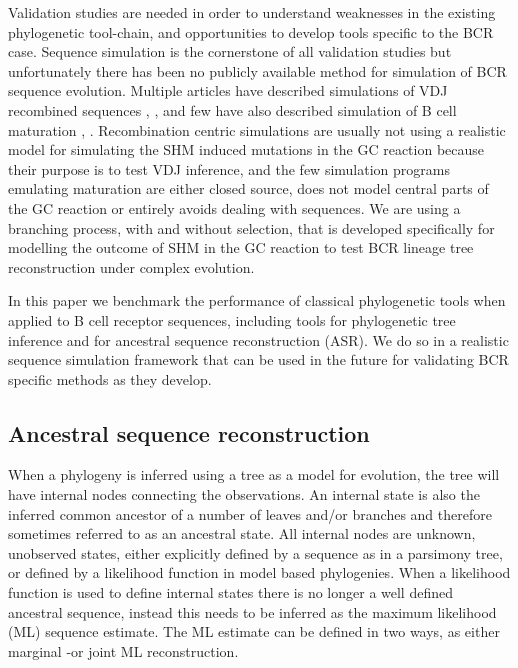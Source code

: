 Validation studies are needed in order to understand weaknesses in the existing phylogenetic tool-chain, and opportunities to develop tools specific to the BCR case.
Sequence simulation is the cornerstone of all validation studies but unfortunately there has been no publicly available method for simulation of BCR sequence evolution.
Multiple articles have described simulations of VDJ recombined sequences \cite{safonova2015igsimulator}, \cite{ralph2016likelihood}, \cite{russ2015htjoinsolver} and few have also described simulation of B cell maturation \cite{shlomchik1998clone}, \cite{kleinstein2003estimating}.
Recombination centric simulations are usually not using a realistic model for simulating the SHM induced mutations in the GC reaction because their purpose is to test VDJ inference, and the few simulation programs emulating maturation are either closed source, does not model central parts of the GC reaction or entirely avoids dealing with sequences.
We are using a branching process, with and without selection, that is developed specifically for modelling the outcome of SHM in the GC reaction to test BCR lineage tree reconstruction under complex evolution.

In this paper we benchmark the performance of classical phylogenetic tools when applied to B cell receptor sequences, including tools for phylogenetic tree inference and for ancestral sequence reconstruction (ASR).
We do so in a realistic sequence simulation framework that can be used in the future for validating BCR specific methods as they develop.




\subsection{Ancestral sequence reconstruction}
When a phylogeny is inferred using a tree as a model for evolution, the tree will have internal nodes connecting the observations.
An internal state is also the inferred common ancestor of a number of leaves and/or branches and therefore sometimes referred to as an ancestral state.
All internal nodes are unknown, unobserved states, either explicitly defined by a sequence as in a parsimony tree, or defined by a likelihood function in model based phylogenies.
When a likelihood function is used to define internal states there is no longer a well defined ancestral sequence, instead this needs to be inferred as the maximum likelihood (ML) sequence estimate.
The ML estimate can be defined in two ways, as either marginal -or joint ML reconstruction.

